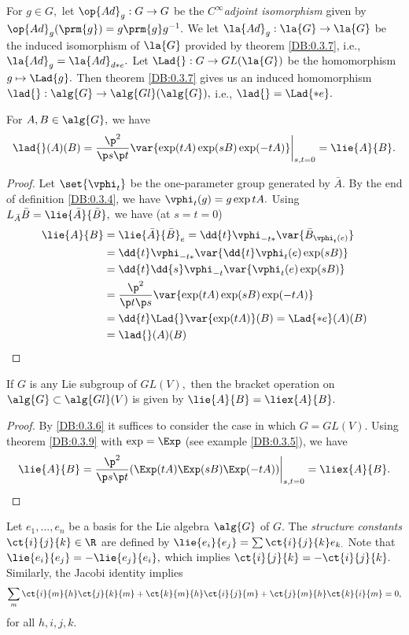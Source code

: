 \begin{defn}
 \label{DB:0.3.8}
For $g \in G,$ let $\op{Ad}_{g}:G \to G$ be the $C^{\infty}$\emph{adjoint isomorphism} given by $\op{Ad}_{g}(\prm{g})=g
\prm{g}g^{-1}.$ We let $\la{Ad}_{g}: \la{G} \to \la{G}$ be the induced isomorphism of $\la{G}$ provided by theorem
\ref{DB:0.3.7}, i.e., $\la{Ad}_{g}=\la{Ad}_{d*e}.$ Let $\Lad{}: G \to GL(\la{G})$ be the homomorphism $g\mapsto
\Lad{g}.$ Then theorem \ref{DB:0.3.7} gives us an induced homomorphism $\lad{}: \alg{G} \to \alg{Gl}(\alg{G}),$ i.e.,
$\lad{}=\Lad{*e}.$
\end{defn}

\begin{thm}
\label{DB:0.3.9}
 For $A,B \in \alg{G},$ we have
$$
\lad{}(A)(B)=\frac{\p^{2}}{\p s \p t}\var{\exp(tA)\exp(sB)\exp(-tA)}\bigg|_{s,t=0}=\lie{A}{B}.
$$
\end{thm}
\begin{proof}
 Let $\set{\vphi_{t}}$ be the one-parameter group generated by $\bar{A}.$ By the end of definition \ref{DB:0.3.4}, we
have $\vphi_{t}(g)=g \exp tA.$ Using $L_{\bar{A}}\bar{B}=\lie{\bar{A}}{\bar{B}},$ we have (at $s=t=0$)
\begin{align*}
 \lie{A}{B}&=\lie{\bar{A}}{\bar{B}}_{e}=\dd{t} \vphi_{-t*}\var{\bar{B}_{\vphi_{t}(e)}} \\
&= \dd{t} \vphi_{-t*} \var{ \dd{t} \vphi_{t}(e)\exp(sB)} \\
&=\dd{t}\dd{s}\vphi_{-t}\var{\vphi_{t}(e)\exp(sB)} \\
&= \frac{\p^{2}}{\p t \p s}\var{\exp (tA)\exp(sB)\exp(-tA)} \\
&= \dd{t}\Lad{}\var{\exp(tA)}(B)=\Lad{*e}(A)(B) \\
&= \lad{}(A)(B)
\end{align*}
\end{proof}

\begin{cor}
 \label{DB:0.3.10}
If $G$ is any Lie subgroup of $GL(V),$ then the bracket operation on $\alg{G} \subset \alg{Gl}(V)$ is given by
$\lie{A}{B}=\liex{A}{B}.$
\end{cor}
\begin{proof}
 By \ref{DB:0.3.6} it suffices to consider the case in which $G=GL(V).$ Using theorem \ref{DB:0.3.9} with $\exp=\Exp$
(see example \ref{DB:0.3.5}), we have
$$
\lie{A}{B}=\frac{\p^{2}}{\p s \p t}(\Exp(tA)\Exp(sB)\Exp(-tA))\bigg|_{s,t=0}=\liex{A}{B}.
$$
\end{proof}

\begin{defn}
 \label{DB:0.3.11}
Let $e_{1},...,e_{n}$ be a basis for the Lie algebra $\alg{G}$ of $G.$ The \emph{structure constants} $\ct{i}{j}{k}\in
\R$ are defined by $\lie{e_{i}}{e_{j}}=\sum \ct{i}{j}{k} e_{k.}$ Note that $\lie{e_{i}}{e_{j}}=-\lie{e_{j}}{e_{i}},$
which implies $\ct{i}{j}{k}=-\ct{i}{j}{k}.$ Similarly, the Jacobi identity implies
$$
\sum_{m}\ct{i}{m}{h}\ct{j}{k}{m} + \ct{k}{m}{h}\ct{i}{j}{m} + \ct{j}{m}{h}\ct{k}{i}{m}=0,
$$
for all $h,i,j,k.$
\end{defn}

